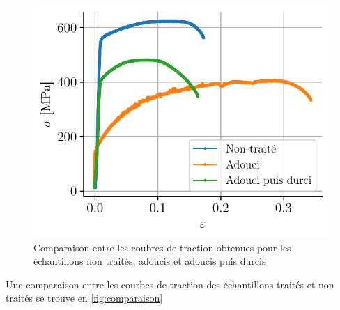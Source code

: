 \begin{figure}
    \centering
    \includegraphics[width=\linewidth]{figures/comparaison.pdf}
    \caption{Comparaison entre les coubres de traction obtenues pour les échantillons non traités, adoucis et adoucis puis durcis}
    \label{fig:comparaison}
\end{figure}
Une comparaison entre les courbes de traction des échantillons traités et non traités se trouve en \autoref{fig:comparaison}
